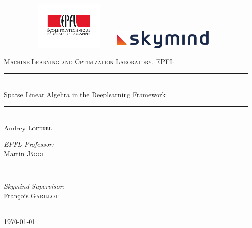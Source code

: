 \begin{titlepage}
	\newcommand{\HRule}{\rule{\linewidth}{0.5mm}} %
	\center
	
	\begin{figure}[!tbp]
		\centering
		\begin{minipage}[b]{0.4\textwidth}
			\includegraphics[width=5cm,height=2.4cm]{images/epfl.pdf}
			\vspace{2cm}
		\end{minipage}
		\hfill
		\begin{minipage}[b]{0.4\textwidth}
			\includegraphics[width=5cm,]{images/skymind.png}
				\vspace{2cm}
		\end{minipage}
	\end{figure}
	

	
	\textsc{\large Machine Learning and Optimization Laboratory, EPFL}\\[0.3cm] 
	\vspace{3cm}
	
	{ 
		\HRule \\[0.4cm]
		\LARGE Sparse Linear Algebra in the Deeplearning Framework} %
	\HRule \\[1.5cm]
	
	\Large Audrey \textsc{Loeffel}\\ %
	\vspace{2.5cm}
	
	\begin{minipage}[t]{0.4\textwidth}
		\begin{flushleft} \large
			\emph{EPFL Professor:} \\
			Martin \textsc{Jäggi}\\ %
		\end{flushleft}
	\end{minipage}
	~
	\begin{minipage}[t]{0.4\textwidth}
		\begin{flushright} \large
			\emph{Skymind Supervisor:} \\
			François \textsc{Garillot}\\ 	
		\end{flushright} 
	\end{minipage}\\[3cm]
	
	{\large \today}\\ %
	
	
	\vfill %
	
\end{titlepage}

